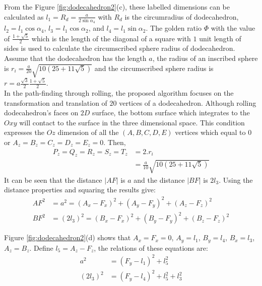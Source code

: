 \noindent From the Figure \ref{fig:dodecahedron2}(c), these labelled dimensions can be calculated as $l_1 = R_d = \frac{a}{2\sin{\alpha_4}}$ with $R_d$ is the circumradius of dodecahedron, $l_2 = l_1\cos{\alpha_4}$, $l_3 = l_1\cos{\alpha_2}$, and $l_4 = l_1\sin{\alpha_2}$. 
The golden ratio $\Phi$ with the value of $\frac{1+\sqrt{5}}{2}$ which is the length of the diagonal of a square with $1$ unit length of sides is used to calculate the circumscribed sphere radius of dodecahedron.
Assume that the dodecahedron has the length $a$, the radius of an inscribed sphere is $r_i = \frac{a}{20}\sqrt{10(25+11\sqrt{5})}$ and the circumscribed sphere radius is $r = a\frac{\sqrt{3}}{2}\frac{1+\sqrt{5}}{2}$.\\


\noindent In the path-finding through rolling, the proposed algorithm focuses on the transformation and translation of $20$ vertices of a dodecahedron. 
Although rolling dodecahedron's faces on $2D$ surface, the bottom surface which integrates to the $Oxy$ will contact to the surface in the three dimensional space. 
This condition expresses the $Oz$ dimension of all the $(A,B,C,D,E)$ vertices which equal to $0$ or $A_z = B_z = C_z = D_z = E_z = 0$. 
Then, 
\begin{equation*} 
\label{equa:eq01}
\begin{split}
P_z = Q_z = R_z = S_z = T_z &= 2.r_i \\
							&= \frac{a}{10}\sqrt{10(25+11\sqrt{5})}
\end{split}
\end{equation*}
\noindent It can be seen that the distance $|AF|$ is $a$ and the distance $|BF|$ is $2l_3$. Using the distance properties and squaring the results give:
\begin{equation*} 
\label{dodeca:eq1}
\begin{split}
AF^2 & = a^2 = (A_x-F_x)^2 + (A_y-F_y)^2 + (A_z-F_z)^2 \\
BF^2 & = (2l_3)^2 = (B_x-F_x)^2 + (B_y-F_y)^2 + (B_z-F_z)^2
\end{split}
\end{equation*}

\noindent Figure \ref{fig:dodecahedron2}(d) shows that $A_x = F_x = 0$, $A_y = l_1$, $B_y = l_4$, $B_x = l_3$, $A_z = B_z$. Define $l_5=A_z-F_z$, the relations of these equations are:
\begin{equation*} 
\label{dodeca:eq2}
\begin{split}
a^2 & = (F_y-l_1)^2 + l_5^2\\
(2l_3)^2 & = (F_y-l_4)^2 + l_5^2 + l_3^2
\end{split}
\end{equation*}


